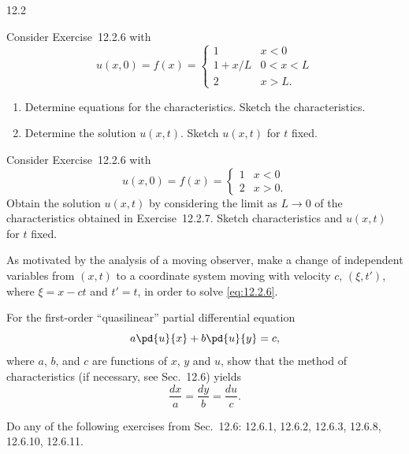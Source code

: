 \begin{exercises}{12.2}
\item \label{ex:12.2.7}
Consider Exercise~12.2.6 with
\[
u(x,0) = f(x) = \begin{cases} 1 & x < 0 \\ 1 + x/L & 0 < x < L \\ 2 & x > L. \end{cases}
\]
\begin{enumerate}
\item[(a)] Determine equations for the characteristics.  Sketch the characteristics.
\item[(b)] Determine the solution $u(x,t)$.  Sketch $u(x,t)$ for $t$ fixed.
\end{enumerate}

\item\starred \label{ex:12.2.8}
Consider Exercise~12.2.6 with
\[
u(x,0) = f(x) = \begin{cases} 1 & x < 0 \\ 2 & x > 0. \end{cases}
\]
Obtain the solution $u(x,t)$ by considering the limit as $L \to 0$ of the characteristics obtained in Exercise~12.2.7.  Sketch characteristics and $u(x,t)$ for $t$ fixed.

\item \label{ex:12.2.9}
As motivated by the analysis of a moving observer, make a change of independent variables from $(x,t)$ to a coordinate system moving with velocity $c$, $(\xi, t')$, where $\xi = x - ct$ and $t' = t$, in order to solve \eqref{eq:12.2.6}.

\item \label{ex:12.2.10}
For the first-order ``quasilinear'' partial differential equation
\[
a\pd{u}{x} + b\pd{u}{y} = c,
\]
where $a$, $b$, and $c$ are functions of $x$, $y$ and $u$, show that the method of characteristics (if necessary, see Sec.~12.6) yields
\[
\frac{dx}{a} = \frac{dy}{b} = \frac{du}{c}.
\]

\item \label{ex:12.2.11}
Do any of the following exercises from Sec.~12.6: 12.6.1, 12.6.2, 12.6.3, 12.6.8, 12.6.10, 12.6.11.

\end{exercises}

